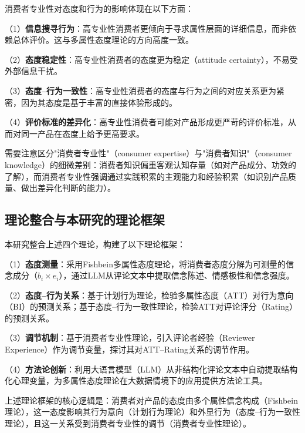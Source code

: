 消费者专业性对态度和行为的影响体现在以下方面：

（1）\textbf{信息搜寻行为}：高专业性消费者更倾向于寻求属性层面的详细信息，而非依赖总体评价。这与多属性态度理论的方向高度一致。

（2）\textbf{态度稳定性}：高专业性消费者的态度更为稳定（attitude certainty），不易受外部信息干扰。

（3）\textbf{态度--行为一致性}：高专业性消费者的态度与行为之间的对应关系更为紧密，因为其态度是基于丰富的直接体验形成的。

（4）\textbf{评价标准的差异化}：高专业性消费者可能对产品形成更严苛的评价标准，从而对同一产品在态度上给予更高要求。

需要注意区分"消费者专业性"（consumer expertise）与"消费者知识"（consumer knowledge）的细微差别：消费者知识偏重客观认知存量（如对产品成分、功效的了解），而消费者专业性强调通过实践积累的主观能力和经验积累（如识别产品质量、做出差异化判断的能力）。

\subsection{理论整合与本研究的理论框架}

本研究整合上述四个理论，构建了以下理论框架：

（1）\textbf{态度测量}：采用Fishbein多属性态度理论，将消费者态度分解为可测量的信念成分（$b_i \times e_i$），通过LLM从评论文本中提取信念陈述、情感极性和信念强度。

（2）\textbf{态度--行为关系}：基于计划行为理论，检验多属性态度（ATT）对行为意向（BI）的预测关系；基于态度--行为一致性理论，检验ATT对评论评分（Rating）的预测关系。

（3）\textbf{调节机制}：基于消费者专业性理论，引入评论者经验（Reviewer Experience）作为调节变量，探讨其对ATT--Rating关系的调节作用。

（4）\textbf{方法论创新}：利用大语言模型（LLM）从非结构化评论文本中自动提取结构化心理变量，为多属性态度理论在大数据情境下的应用提供方法论工具。

上述理论框架的核心逻辑是：消费者对产品的态度由多个属性信念构成（Fishbein理论），这一态度影响其行为意向（计划行为理论）和外显行为（态度--行为一致性理论），且这一关系受到消费者专业性的调节（消费者专业性理论）。
